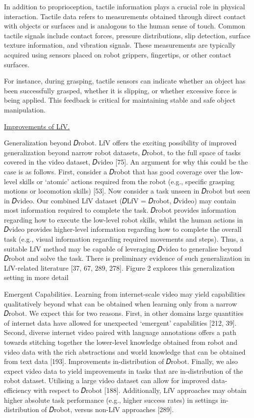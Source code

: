 In addition to proprioception, tactile information plays a crucial role in physical interaction. Tactile data refers to measurements obtained through direct contact with objects or surfaces and is analogous to the human sense of touch. Common tactile signals include contact forces, pressure distributions, slip detection, surface texture information, and vibration signals. These measurements are typically acquired using sensors placed on robot grippers, fingertips, or other contact surfaces.

For instance, during grasping, tactile sensors can indicate whether an object has been successfully grasped, whether it is slipping, or whether excessive force is being applied. This feedback is critical for maintaining stable and safe object manipulation.





\underline{Improvements of LfV.}

Generalization beyond 𝐷robot. LfV offers the exciting possibility of improved generalization beyond narrow
robot datasets, 𝐷robot, to the full space of tasks covered in the video dataset, 𝐷video [75]. An argument for why
this could be the case is as follows. First, consider a 𝐷robot that has good coverage over the low-level skills or
‘atomic’ actions required from the robot (e.g., specific grasping motions or locomotion skills) [53]. Now consider
a task unseen in 𝐷robot but seen in 𝐷video. Our combined LfV dataset (𝐷LfV = {𝐷robot, 𝐷video}) may contain most
information required to complete the task. 𝐷robot provides information regarding how to execute the low-level
robot skills, whilst the human actions in 𝐷video provides higher-level information regarding how to complete the
overall task (e.g., visual information regarding required movements and steps). Thus, a suitable LfV method may
be capable of leveraging 𝐷video to generalise beyond 𝐷robot and solve the task. There is preliminary evidence of
such generalization in LfV-related literature [37, 67, 289, 278]. Figure 2 explores this generalization setting in
more detail



Emergent Capabilities. Learning from internet-scale video may yield capabilities qualitatively beyond what can
be obtained when learning only from a narrow 𝐷robot. We expect this for two reasons. First, in other domains large
quantities of internet data have allowed for unexpected ‘emergent’ capabilities [212, 39]. Second, diverse internet
video paired with language annotations offers a path towards stitching together the lower-level knowledge
obtained from robot and video data with the rich abstractions and world knowledge that can be obtained from
text data [193].
Improvements in-distribution of 𝐷robot. Finally, we also expect video data to yield improvements in tasks that
are in-distribution of the robot dataset. Utilising a large video dataset can allow for improved data-efficiency
with respect to 𝐷robot [188]. Additionally, LfV approaches may obtain higher absolute task performance (e.g.,
higher success rates) in settings in-distribution of 𝐷robot, versus non-LfV approaches [289].







